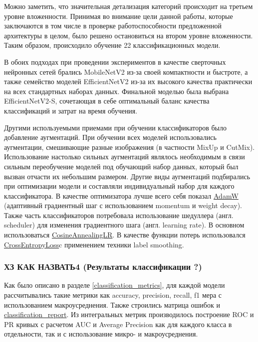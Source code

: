 \documentclass[a4paper,12pt]{extarticle}
\begin{document}
Можно заметить, что значительная детализация категорий происходит на третьем уровне вложенности. Принимая во внимание цели данной работы, которые заключаются в том числе в проверке работоспособности предложенной архитектуры в целом, было решено остановиться на втором уровне вложенности. Таким образом, происходило обучение 22 классификационных модели.

В обоих подходах при проведении экспериментов в качестве сверточных нейронных сетей брались MobileNetV2 из-за своей компактности и быстроте, а также семейство моделей EfficientNetV2 из-за их высокого качества практически на всех стандартных наборах данных. Финальной моделью была выбрана EfficientNetV2-S, сочетающая в себе оптимальный баланс качества классификаций и затрат на время обучения.

Другими используемыми приемами при обучении классификаторов было добавление аугментаций. При обучении всех моделей использовались аугментации, смешивающие разные изображения (в частности MixUp и CutMix\cite{cutmix}). Использование настолько сильных аугментаций являлось необходимым в связи сильным переобучение моделей под обучающий набор данных, который был вызван отчасти их небольшим размером. Другие виды аугментаций подбирались при оптимизации модели и составляли индивидуальный набор для каждого классификатора. В качестве оптимизатора лучше всего себя показал \href{https://pytorch.org/docs/stable/generated/torch.optim.AdamW.html}{AdamW} (адаптивный градиентный шаг с использованием momentum и weight decay). Также часть классификаторов потребовала использование шедуллера (англ. scheduler) для изменения градиентного шага (англ. learning rate). В основном использоваться \href{https://pytorch.org/docs/stable/generated/torch.optim.lr_scheduler.CosineAnnealingLR.html}{CosineAnnealingLR}. В качестве функции потерь использовался \href{https://pytorch.org/docs/stable/generated/torch.nn.CrossEntropyLoss.html}{CrossEntropyLoss}c применением техники label smoothing.

\subsubsection{ХЗ КАК НАЗВАТЬ4 (Результаты классификации ?)}

Как было описано в разделе \ref{classification_metrics}, для каждой модели рассчитывались такие метрики как accuracy, precision, recall, f1 мера с использованием макроусреднения. Также строились матрица ошибок и \href{https://scikit-learn.org/stable/modules/generated/sklearn.metrics.classification_report.html}{classification\_report}. Из интегральных метрик производилось построение ROC и PR кривых с расчетом AUC и Average Precision как для каждого класса в отдельности, так и с использование микро- и макроусреднения.
\end{document}
